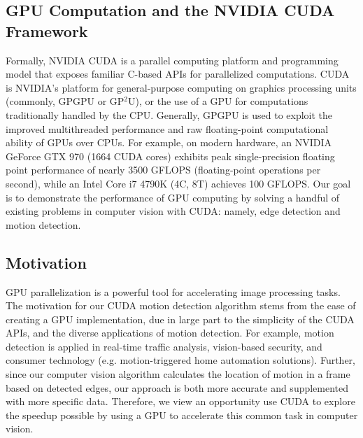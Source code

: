 \documentclass[journal]{IEEEtran}
\begin{document}
\subsection{GPU Computation and the NVIDIA CUDA Framework}
Formally, NVIDIA CUDA is a parallel computing platform and programming model that exposes familiar C-based APIs for parallelized computations. CUDA is NVIDIA's platform for general-purpose computing on graphics processing units (commonly, GPGPU or GP$^2$U), or the use of a GPU for computations traditionally handled by the CPU. Generally, GPGPU is used to exploit the improved multithreaded performance and raw floating-point computational ability of GPUs over CPUs. For example, on modern hardware, an NVIDIA GeForce GTX 970 (1664 CUDA cores) exhibits peak single-precision floating point performance of nearly 3500 GFLOPS (floating-point operations per second), while an Intel Core i7 4790K (4C, 8T) achieves 100 GFLOPS. Our goal is to demonstrate the performance of GPU computing by solving a handful of existing problems in computer vision with CUDA: namely, edge detection and motion detection.

\subsection{Motivation}
GPU parallelization is a powerful tool for accelerating image processing tasks. The motivation for our CUDA motion detection algorithm stems from the ease of creating a GPU implementation, due in large part to the simplicity of the CUDA APIs, and the diverse applications of motion detection. For example, motion detection is applied in real-time traffic analysis, vision-based security, and consumer technology (e.g. motion-triggered home automation solutions). Further, since our computer vision algorithm calculates the location of motion in a frame based on detected edges, our approach is both more accurate and supplemented with more specific data. Therefore, we view an opportunity use CUDA to explore the speedup possible by using a GPU to accelerate this common task in computer vision.
\end{document}
